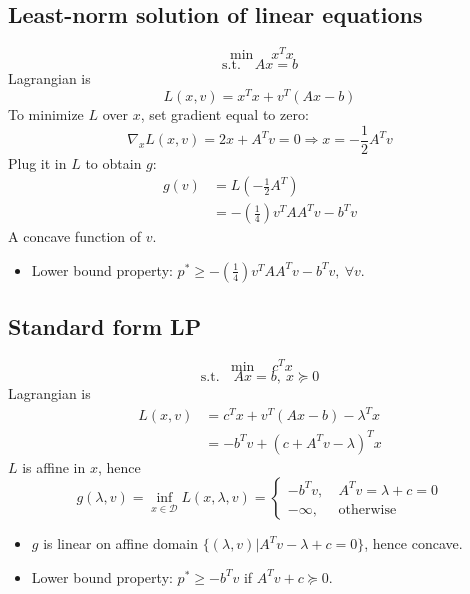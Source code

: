 \subsection{Least-norm solution of linear equations}
$$
\min \quad x^Tx
$$
$$
\text{s.t.} \quad
    Ax = b
$$
Lagrangian is 
$$
L(x, v) = x^Tx + v^T(Ax - b)
$$
To minimize $L$ over $x$, set gradient equal to zero:
$$
\nabla_xL(x, v) = 2x + A^Tv = 0
\Rightarrow x = -\frac{1}{2}A^Tv
$$
Plug it in $L$ to obtain $g$:
\begin{align}
    g(v) & = L(-\frac{1}{2}A^T) \nonumber \\
    & = -(\frac{1}{4})v^TAA^Tv - b^Tv \nonumber
\end{align}
A concave function of $v$.
\begin{itemize}
    \item Lower bound property: $p^* \ge -(\frac{1}{4})v^TAA^Tv - b^Tv, \ \forall v$.
\end{itemize}

\subsection{Standard form LP}
$$
\min \quad c^Tx
$$
$$
\text{s.t.} \quad
    Ax = b, \ x \succcurlyeq 0
$$
Lagrangian is 
\begin{align}
    L(x, v) & = c^Tx + v^T(Ax - b) - \lambda^Tx \nonumber \\
    & = -b^Tv + (c + A^Tv - \lambda)^Tx \nonumber
\end{align}
$L$ is affine in $x$, hence
$$
g(\lambda, v) = \inf_{x \in \mathcal{D}} L(x, \lambda, v) = 
\begin{cases}
    -b^Tv, \ & A^Tv = \lambda + c = 0 \\
    - \infty, \ & \text{otherwise}
\end{cases}
$$
\begin{itemize}
    \item $g$ is linear on affine domain $\{(\lambda, v) | A^Tv - \lambda + c = 0\}$, hence concave.
    \item Lower bound property: $p^* \ge -b^Tv$ if $A^Tv + c \succcurlyeq 0$.
\end{itemize}

